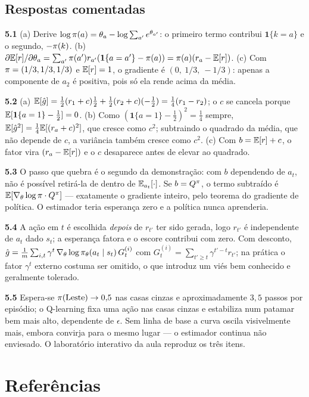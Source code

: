 \documentclass[11pt]{article}
\newcommand{\thv}{\theta}
\newcommand{\polth}{\pol_{\thv}}
\newcommand{\gth}{\nabla_{\thv}}
\begin{document}
\subsection*{Respostas comentadas}

\textbf{5.1} (a) Derive $\log\pol(a) = \thv_a - \log\sum_{a'}e^{\thv_{a'}}$: o
primeiro termo contribui $\mathbf{1}\{k=a\}$ e o segundo, $-\pi(k)$.
(b) $\partial\E[r]/\partial\thv_a = \sum_{a'}\pol(a')r_{a'}(\mathbf{1}\{a=a'\}-\pol(a))
= \pol(a)(r_a - \E[r])$.
(c) Com $\pi=(1/3,1/3,1/3)$ e $\mathbb{E}[r]=1$, o gradiente é
$(0,\ 1/3,\ -1/3)$: apenas a componente de $a_2$ é positiva, pois só ela rende
acima da média.

\smallskip
\textbf{5.2} (a) $\mathbb{E}[\hat g] = \tfrac12(r_1+c)\tfrac12 + \tfrac12(r_2+c)(-\tfrac12)
= \tfrac14(r_1-r_2)$; o $c$ se cancela porque
$\mathbb{E}[\mathbf{1}\{a=1\}-\tfrac12]=0$. (b) Como
$(\mathbf{1}\{a=1\}-\tfrac12)^2 = \tfrac14$ sempre,
$\mathbb{E}[\hat g^2] = \tfrac14\mathbb{E}[(r_a+c)^2]$, que cresce como $c^2$; subtraindo o
quadrado da média, que não depende de $c$, a variância também cresce como $c^2$.
(c) Com $b=\mathbb{E}[r]+c$, o fator vira $(r_a - \mathbb{E}[r])$ e o $c$ desaparece antes de
elevar ao quadrado.

\smallskip
\textbf{5.3} O passo que quebra é o segundo da demonstração: com $b$ dependendo
de $a_t$, não é possível retirá-la de dentro de $\mathbb{E}_{a_t}[\cdot]$. Se $b=Q^{\pi}$,
o termo subtraído é $\E[\gth\log\pol\cdot\Qpi]$ --- exatamente o gradiente
inteiro, pelo teorema do gradiente de política. O estimador teria esperança zero
e a política nunca aprenderia.

\smallskip
\textbf{5.4} A ação em $t$ é escolhida \emph{depois} de $r_{t'}$ ter sido
gerada, logo $r_{t'}$ é independente de $a_t$ dado $s_t$; a esperança fatora e o
escore contribui com zero. Com desconto,
$\hat g = \frac{1}{m}\sum_{i,t}\gamma^t\,\gth\log\polth(a_t\mid s_t)\,G^{(i)}_t$
com $G^{(i)}_t=\sum_{t'\ge t}\gamma^{t'-t}r_{t'}$; na prática o fator $\gamma^t$
externo costuma ser omitido, o que introduz um viés bem conhecido e geralmente
tolerado.

\smallskip
\textbf{5.5} Espera-se $\pi(\text{Leste})\to 0{,}5$ nas casas cinzas e
aproximadamente $3{,}5$ passos por episódio; o Q-learning fixa uma ação nas casas
cinzas e estabiliza num patamar bem mais alto, dependente de $\epsilon$. Sem
linha de base a curva oscila visivelmente mais, embora convirja para o mesmo
lugar --- o estimador continua não enviesado. O laboratório interativo da aula
reproduz os três itens.

\section*{Referências}
\end{document}

